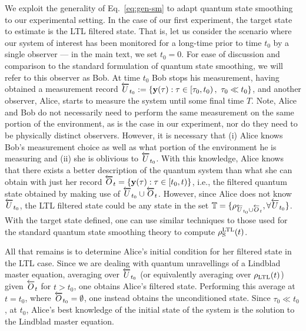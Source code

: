 \documentclass[./Main-revtex.tex]{subfiles}
\begin{document}
We exploit the generality of Eq.~\eqref{eq:gen-sm} to adapt quantum state smoothing to our experimental setting.
In the case of our first experiment, the target state to estimate is the LTL filtered state. That is, let us consider the scenario where our system of interest has been monitored for a long-time prior to time $t_0$ by a single observer --- in the main text, we set $t_0 = 0$. For ease of discussion and comparison to the standard formulation of quantum state smoothing, we will refer to this observer as Bob. At time $t_0$ Bob stops his measurement, having obtained a measurement record $\overleftarrow{U}_{t_0}:=\{{\bf y}(\tau):\tau \in [\tau_0,t_0)\,,\,\, \tau_0\ll t_0 \}$, and another observer, Alice, starts to measure the system until some final time $T$. Note, Alice and Bob do not necessarily need to perform the same measurement on the same portion of the environment, as is the case in our experiment, nor do they need to be physically distinct observers. However, it is necessary that (i) Alice knows Bob's measurement choice as well as what portion of the environment he is measuring and (ii) she is oblivious to $\overleftarrow{U}_{t_0}$. With this knowledge, Alice knows that there exists a better description of the quantum system than what she can obtain with just her record $\overleftarrow{O}_t = \{{\bf y}(\tau):\tau \in [t_0,t) \}$, i.e., the filtered quantum state obtained by making use of $\overleftarrow{U}_{t_0}\cup\overleftarrow{O}_t$. However, since Alice does not know $\overleftarrow{U}_{t_0}$, the LTL filtered state could be any state in the set ${\mathbb T} = \{\rho_{\overleftarrow{U}_{t_0}\cup\overleftarrow{O}_t}, \forall \overleftarrow{U}_{t_0}\}$. 
With the target state defined, one can use similar %
techniques to those used for the standard quantum state smoothing theory \cite{GueWis20} to compute $\rho_{\text S}^{\rm LTL}(t)$. %

All that remains is to determine Alice's initial condition for her filtered state in the LTL case. Since we are dealing with quantum unravellings of a Lindblad master equation, averaging over $\overleftarrow{U}_{t_0}$ (or equivalently averaging over $\rho_{\rm LTL}(t)$) given $\overleftarrow{O}_t$ for $t>t_0$, one obtains Alice's filtered state. Performing this average at $t = t_0$, where $\overleftarrow{O}_{t_0} = \emptyset$, one instead obtains the unconditioned state. Since $\tau_0\ll t_0$, at $t_0$, Alice's best knowledge of the initial state of the system is the solution to the Lindblad master equation.
\end{document}

